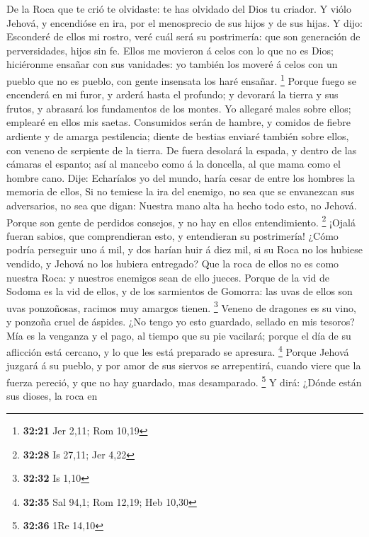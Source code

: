  De la Roca que te crió te olvidaste: te has olvidado del
Dios tu criador.  Y viólo Jehová, y encendióse en ira, por
el menosprecio de sus hijos y de sus hijas.  Y dijo:
Esconderé de ellos mi rostro, veré cuál será su postrimería: que son
generación de perversidades, hijos sin fe.  Ellos me
movieron á celos con lo que no es Dios; hiciéronme ensañar con sus
vanidades: yo también los moveré á celos con un pueblo que no es pueblo,
con gente insensata los haré ensañar. \footnote{\textbf{32:21} Jer 2,11;
  Rom 10,19}  Porque fuego se encenderá en mi furor, y
arderá hasta el profundo; y devorará la tierra y sus frutos, y abrasará
los fundamentos de los montes.  Yo allegaré males sobre
ellos; emplearé en ellos mis saetas.  Consumidos serán de
hambre, y comidos de fiebre ardiente y de amarga pestilencia; diente de
bestias enviaré también sobre ellos, con veneno de serpiente de la
tierra.  De fuera desolará la espada, y dentro de las
cámaras el espanto; así al mancebo como á la doncella, al que mama como
el hombre cano.  Dije: Echaríalos yo del mundo, haría cesar
de entre los hombres la memoria de ellos,  Si no temiese la
ira del enemigo, no sea que se envanezcan sus adversarios, no sea que
digan: Nuestra mano alta ha hecho todo esto, no Jehová. 
Porque son gente de perdidos consejos, y no hay en ellos entendimiento.
\footnote{\textbf{32:28} Is 27,11; Jer 4,22}  ¡Ojalá fueran
sabios, que comprendieran esto, y entendieran su postrimería!
 ¿Cómo podría perseguir uno á mil, y dos harían huir á diez
mil, si su Roca no los hubiese vendido, y Jehová no los hubiera
entregado?  Que la roca de ellos no es como nuestra Roca: y
nuestros enemigos sean de ello jueces.  Porque de la vid de
Sodoma es la vid de ellos, y de los sarmientos de Gomorra: las uvas de
ellos son uvas ponzoñosas, racimos muy amargos tienen. \footnote{\textbf{32:32}
  Is 1,10}  Veneno de dragones es su vino, y ponzoña cruel
de áspides.  ¿No tengo yo esto guardado, sellado en mis
tesoros?  Mía es la venganza y el pago, al tiempo que su
pie vacilará; porque el día de su aflicción está cercano, y lo que les
está preparado se apresura. \footnote{\textbf{32:35} Sal 94,1; Rom
  12,19; Heb 10,30}  Porque Jehová juzgará á su pueblo, y
por amor de sus siervos se arrepentirá, cuando viere que la fuerza
pereció, y que no hay guardado, mas desamparado. \footnote{\textbf{32:36}
  1Re 14,10}  Y dirá: ¿Dónde están sus dioses, la roca en
